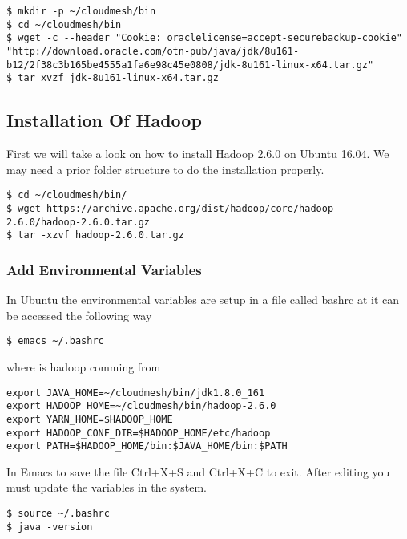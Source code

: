 \begin{lstlisting}
$ mkdir -p ~/cloudmesh/bin
$ cd ~/cloudmesh/bin
$ wget -c --header "Cookie: oraclelicense=accept-securebackup-cookie" "http://download.oracle.com/otn-pub/java/jdk/8u161-b12/2f38c3b165be4555a1fa6e98c45e0808/jdk-8u161-linux-x64.tar.gz"
$ tar xvzf jdk-8u161-linux-x64.tar.gz
\end{lstlisting}

\subsection{Installation Of Hadoop}\label{installation-of-hadoop}

First we will take a look on how to install Hadoop 2.6.0 on Ubuntu
16.04. We may need a prior folder structure to do the installation
properly.

\begin{lstlisting}
$ cd ~/cloudmesh/bin/
$ wget https://archive.apache.org/dist/hadoop/core/hadoop-2.6.0/hadoop-2.6.0.tar.gz
$ tar -xzvf hadoop-2.6.0.tar.gz
\end{lstlisting}

\subsubsection{Add Environmental
Variables}\label{add-environmental-variables}

In Ubuntu the environmental variables are setup in a file called bashrc
at it can be accessed the following way

\begin{lstlisting}
$ emacs ~/.bashrc

\end{lstlisting}

where is hadoop comming from

\begin{lstlisting}
export JAVA_HOME=~/cloudmesh/bin/jdk1.8.0_161
export HADOOP_HOME=~/cloudmesh/bin/hadoop-2.6.0
export YARN_HOME=$HADOOP_HOME
export HADOOP_CONF_DIR=$HADOOP_HOME/etc/hadoop
export PATH=$HADOOP_HOME/bin:$JAVA_HOME/bin:$PATH
\end{lstlisting}

In Emacs to save the file Ctrl+X+S and Ctrl+X+C to exit. After editing
you must update the variables in the system.

\begin{lstlisting}
$ source ~/.bashrc
$ java -version
\end{lstlisting}

